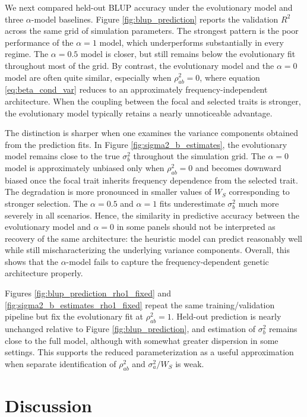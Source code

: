 \documentclass[10pt]{article}
\begin{document}
We next compared held-out BLUP accuracy under the evolutionary model and three $\alpha$-model baselines. 
Figure \ref{fig:blup_prediction} reports the validation $R^2$ across the same grid of simulation parameters. 
The strongest pattern is the poor performance of the $\alpha=1$ model, 
which underperforms substantially in every regime. 
The $\alpha=0.5$ model is closer, but still remains below the evolutionary fit throughout most of the grid. 
By contrast, the evolutionary model and the $\alpha=0$ model are often quite similar, especially when $\rho_{ab}^2=0$, 
where equation \ref{eq:beta_cond_var} reduces to an approximately frequency-independent architecture. 
When the coupling between the focal and selected traits is stronger, the evolutionary model typically retains a nearly unnoticeable advantage.


The distinction is sharper when one examines the variance components obtained from the prediction fits. 
In Figure \ref{fig:sigma2_b_estimates}, the evolutionary model remains close to the true $\sigma_b^2$ throughout the simulation grid. 
The $\alpha=0$ model is approximately unbiased only when $\rho_{ab}^2=0$ and becomes downward biased once the focal trait inherits frequency dependence from the selected trait. 
The degradation is more pronounced in smaller values of $W_S$ corresponding to stronger selection.
The $\alpha=0.5$ and $\alpha=1$ fits underestimate $\sigma_b^2$ much more severely in all scenarios. 
Hence, the similarity in predictive accuracy between the evolutionary model and $\alpha=0$ in some panels should not be interpreted as recovery of the same architecture: the heuristic model can predict reasonably well while still mischaracterizing the underlying variance components.
Overall, this shows that the $\alpha$-model fails to capture the frequency-dependent genetic architecture properly.

Figures \ref{fig:blup_prediction_rho1_fixed} and \ref{fig:sigma2_b_estimates_rho1_fixed} repeat the same training/validation pipeline but fix the evolutionary fit at $\rho_{ab}^2=1$. 
Held-out prediction is nearly unchanged relative to Figure \ref{fig:blup_prediction}, 
and estimation of $\sigma_b^2$ remains close to the full model, 
although with somewhat greater dispersion in some settings. 
This supports the reduced parameterization as a useful approximation when separate identification of $\rho_{ab}^2$ and $\sigma_a^2 / W_S$ is weak.

\section{Discussion}
\end{document}
